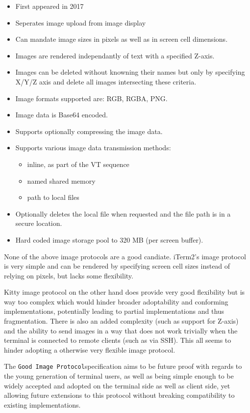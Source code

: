 \documentclass[a4paper]{article}
\newcommand{\code}[1]{\colorbox{light-gray}{\texttt{#1}}}
\newcommand{\GoodImageProtocol}{\code{Good Image Protocol}}
\begin{document}
\begin{itemize}
    \item First appeared in 2017
    \item Seperates image upload from image display
    \item Can mandate image sizes in pixels as well as in screen cell dimensions.
    \item Images are rendered independantly of text with a specified Z-axis.
    \item Images can be deleted without knowning their names but only by specifying X/Y/Z axis
          and delete all images intersecting these criteria.
    \item Image formats supported are: RGB, RGBA, PNG.
    \item Image data is Base64 encoded.
    \item Supports optionally compressing the image data.
    \item Supports various image data transmission methods:
        \begin{itemize}
            \item inline, as part of the VT sequence
            \item named shared memory
            \item path to local files
        \end{itemize}
    \item Optionally deletes the local file when requested and the file path is in a secure location.
    \item Hard coded image storage pool to 320 MB (per screen buffer).
\end{itemize}

None of the above image protocols are a good candiate. iTerm2's image protocol is very simple and
can be rendered by specifying screen cell sizes instead of relying on pixels, but lacks some
flexibility.

Kitty image protocol on the other hand does provide very good flexibility but is way too complex which
would hinder broader adoptability and conforming implementations, potentially leading to partial
implementations and thus fragmentation.
There is also an added complexity (such as support for Z-axis) and the ability
to send images in a way that does not work trivially when the terminal is
connected to remote clients (such as via SSH). This all seems to hinder
adopting a otherwise very flexible image protocol.

The \GoodImageProtocol specification aims to be future proof with regards to
the young generation of terminal users, as well as being simple enough
to be widely accepted and adopted on the terminal side as well as client side,
yet allowing future extensions to this protocol
without breaking compatibility to existing implementations.
\end{document}
